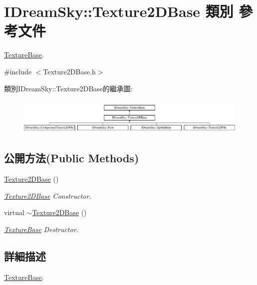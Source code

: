\hypertarget{class_i_dream_sky_1_1_texture2_d_base}{}\section{I\+Dream\+Sky\+:\+:Texture2\+D\+Base 類別 參考文件}
\label{class_i_dream_sky_1_1_texture2_d_base}


\hyperlink{class_i_dream_sky_1_1_texture_base}{Texture\+Base}.  




{\ttfamily \#include $<$Texture2\+D\+Base.\+h$>$}

類別\+I\+Dream\+Sky\+:\+:Texture2\+D\+Base的繼承圖\+:\begin{figure}[H]
\begin{center}
\leavevmode
\includegraphics[height=1.779661cm]{class_i_dream_sky_1_1_texture2_d_base}
\end{center}
\end{figure}
\subsection*{公開方法(Public Methods)}
\begin{DoxyCompactItemize}
\item 
\hyperlink{class_i_dream_sky_1_1_texture2_d_base_a36da2f8884438f47f227607183c7d03b}{Texture2\+D\+Base} ()
\begin{DoxyCompactList}\small\item\em \hyperlink{class_i_dream_sky_1_1_texture2_d_base}{Texture2\+D\+Base} Constructor. \end{DoxyCompactList}\item 
virtual \hyperlink{class_i_dream_sky_1_1_texture2_d_base_a4da55b401b37445d136dd6630bb6a21f}{$\sim$\+Texture2\+D\+Base} ()
\begin{DoxyCompactList}\small\item\em \hyperlink{class_i_dream_sky_1_1_texture_base}{Texture\+Base} Destructor. \end{DoxyCompactList}\end{DoxyCompactItemize}


\subsection{詳細描述}
\hyperlink{class_i_dream_sky_1_1_texture_base}{Texture\+Base}. 

